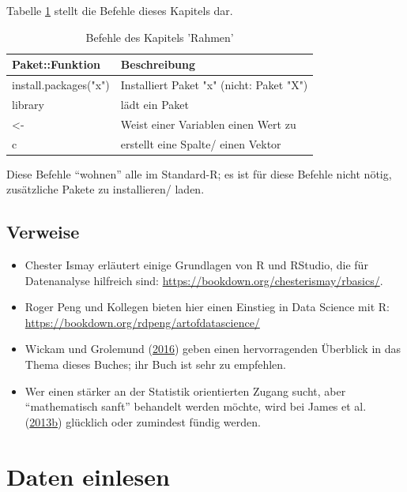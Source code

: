 \documentclass[12pt,ngerman,]{book}
\begin{document}
Tabelle \ref{tab:befehle-rahmen} stellt die Befehle dieses Kapitels dar.

\begin{table}

\caption{\label{tab:befehle-rahmen}Befehle des Kapitels 'Rahmen'}
\centering
\begin{tabular}[t]{l|l}
\hline
Paket::Funktion & Beschreibung\\
\hline
install.packages("x") & Installiert Paket "x" (nicht: Paket "X")\\
\hline
library & lädt ein Paket\\
\hline
<- & Weist einer Variablen einen Wert zu\\
\hline
c & erstellt eine Spalte/ einen Vektor\\
\hline
\end{tabular}
\end{table}

Diese Befehle ``wohnen'' alle im Standard-R; es ist für diese Befehle
nicht nötig, zusätzliche Pakete zu installieren/ laden.

\section{Verweise}\label{verweise}

\begin{itemize}
\item
  Chester Ismay erläutert einige Grundlagen von R und RStudio, die für
  Datenanalyse hilfreich sind:
  \url{https://bookdown.org/chesterismay/rbasics/}.
\item
  Roger Peng und Kollegen bieten hier einen Einstieg in Data Science mit
  R: \url{https://bookdown.org/rdpeng/artofdatascience/}
\item
  Wickam und Grolemund (\protect\hyperlink{ref-r4ds}{2016}) geben einen
  hervorragenden Überblick in das Thema dieses Buches; ihr Buch ist sehr
  zu empfehlen.
\item
  Wer einen stärker an der Statistik orientierten Zugang sucht, aber
  ``mathematisch sanft'' behandelt werden möchte, wird bei James et al.
  (\protect\hyperlink{ref-introstatlearning}{2013}\protect\hyperlink{ref-introstatlearning}{b})
  glücklich oder zumindest fündig werden.
\end{itemize}

\chapter{Daten einlesen}\label{daten-einlesen}
\end{document}
